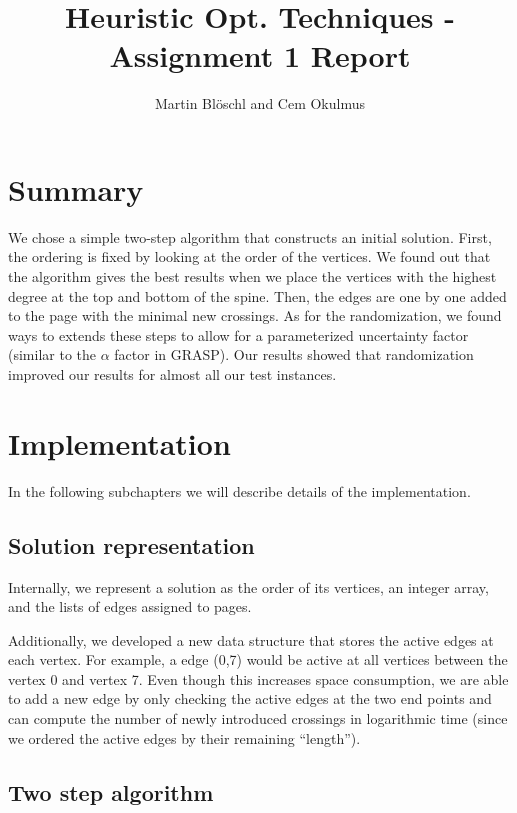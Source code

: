 \documentclass [11pt]{article}
\begin{document}
\title{ Heuristic Opt. Techniques - Assignment 1 Report}
\author{ Martin Blöschl and Cem Okulmus }

\maketitle
\thispagestyle{empty}

\section{Summary}
We chose a simple two-step algorithm that constructs an initial solution. First, the ordering is fixed by looking at the order of the vertices. We found out that the algorithm gives the best results when we place the vertices with the highest degree at the top and bottom of the spine. Then, the edges are one by one added to the page with the minimal new crossings.
 As for the randomization, we found ways to extends these steps to allow for a parameterized uncertainty factor (similar to the $\alpha$ factor in GRASP). 
Our results showed that randomization improved our results for almost all our test instances. 

\section{Implementation}

In the following subchapters we will describe details of the implementation.

\subsection{Solution representation}
Internally, we represent a solution as the order of its vertices, an integer array, and the lists of edges assigned to pages. 

Additionally, we developed a new data structure that stores the active edges at each vertex. For example, a edge (0,7) would be active at all vertices between the vertex 0 and vertex 7. Even though this increases space consumption, we are able to add a new edge by only checking the active edges at the two end points and can compute the number of newly introduced crossings in logarithmic time (since we ordered the active edges by their remaining ``length''). 

\subsection{Two step algorithm}
\end{document}
